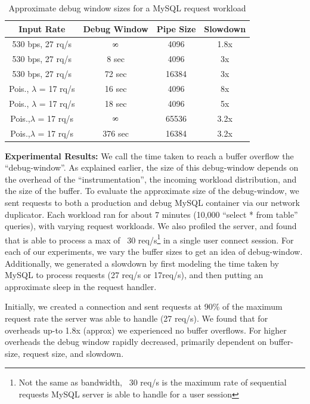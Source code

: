 \begin{table}[ht]
	\centering
	\setlength{\tabcolsep}{2pt}
	\begin{tabular}{c c c c }
		\toprule
		{\bf Input Rate} & \textbf{Debug Window} & \textbf{Pipe Size} & \textbf{Slowdown} \\ \midrule
		530 bps, 27 rq/s & $\infinity$ & 4096 & 1.8x \\ %
		530 bps, 27 rq/s & 8 sec & 4096 & 3x \\ %
		530 bps, 27 rq/s & 72 sec & 16384 & 3x \\ %
		Pois., $\lambda$ = 17 rq/s & 16 sec & 4096 & 8x \\ %
		Pois., $\lambda$ = 17 rq/s & 18 sec & 4096 & 5x \\ %
		Pois.,$\lambda$ = 17 rq/s & $\infinity$ & 65536 & 3.2x \\ %
		Pois.,$\lambda$ = 17 rq/s & 376 sec & 16384 & 3.2x \\ %
		\bottomrule
	\end{tabular}
	\caption{Approximate debug window sizes for a MySQL request workload}
	\label{table:timewindow}
\end{table}

\noindent
\textbf{Experimental Results:} We call the time taken to reach a buffer overflow the ``debug-window''.
As explained earlier, the size of this debug-window depends on the overhead of the ``instrumentation'', the incoming workload distribution, and the size of the buffer.
To evaluate the approximate size of the debug-window, we sent requests to both a production and debug MySQL container via our network duplicator.
Each workload ran for about 7 minutes (10,000 ``select * from table'' queries), with varying request workloads.
We also profiled the server, and found that is able to process a max of ~30 req/s\footnote{Not the same as bandwidth, ~30 req/s is the maximum rate of sequential requests MySQL server is able to handle for a user session} in a single user connect session. 
For each of our experiments, we vary the buffer sizes to get an idea of debug-window. 
Additionally, we generated a slowdown by first modeling the time taken by MySQL to process requests (27 req/s or 17req/s), and then putting an approximate sleep in the request handler.

Initially, we created a connection and sent requests at 90\% of the maximum request rate the server was able to handle (27 req/s).
We found that for overheads up-to 1.8x (approx) we experienced no buffer overflows.
For higher overheads the debug window rapidly decreased, primarily dependent on buffer-size, request size, and slowdown.


